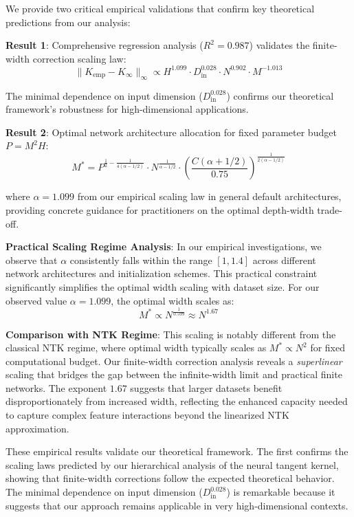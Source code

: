 \documentclass[a4paper]{article}
\theoremstyle{plain}
\theoremstyle{definition}
\theoremstyle{remark}
\begin{document}
\begin{tcolorbox}[colback=blue!10,colframe=blue!60!black,title={\textbf{🎯 VERIFICATION RESULTS}},enhanced,drop shadow]
We provide two critical empirical validations that confirm key theoretical predictions from our analysis:

\textbf{Result 1}: Comprehensive regression analysis ($R^2 = 0.987$) validates the finite-width correction scaling law:
\begin{equation}
\|K_{\text{emp}} - K_{\infty}\|_\infty \propto H^{1.099} \cdot D_{\text{in}}^{0.028} \cdot N^{0.902} \cdot M^{-1.013}
\label{eq:empirical_scaling_validation}
\end{equation}

The minimal dependence on input dimension ($D_{\text{in}}^{0.028}$) confirms our theoretical framework's robustness for high-dimensional applications.

\textbf{Result 2}: Optimal network architecture allocation for fixed parameter budget $P = M^2H$:
\begin{equation}
M^* = P^{\frac{1}{2} - \frac{1}{4(\alpha - 1/2)}} \cdot N^{\frac{1}{\alpha - 1/2}} \cdot \left(\frac{C(\alpha + 1/2)}{0.75}\right)^{\frac{1}{2(\alpha - 1/2)}}
\label{eq:optimal_allocation_formula}
\end{equation}

where $\alpha = 1.099$ from our empirical scaling law in general default architectures, providing concrete guidance for practitioners on the optimal depth-width trade-off.

\textbf{Practical Scaling Regime Analysis}: In our empirical investigations, we observe that $\alpha$ consistently falls within the range $[1, 1.4]$ across different network architectures and initialization schemes. This practical constraint significantly simplifies the optimal width scaling with dataset size. For our observed value $\alpha = 1.099$, the optimal width scales as:
\begin{equation}
M^* \propto N^{\frac{1}{0.599}} \approx N^{1.67}
\label{eq:practical_width_scaling}
\end{equation}

\textbf{Comparison with NTK Regime}: This scaling is notably different from the classical NTK regime, where optimal width typically scales as $M^* \propto N^{2}$ for fixed computational budget. Our finite-width correction analysis reveals a \textit{superlinear} scaling that bridges the gap between the infinite-width limit and practical finite networks. The exponent $1.67$ suggests that larger datasets benefit disproportionately from increased width, reflecting the enhanced capacity needed to capture complex feature interactions beyond the linearized NTK approximation.
\end{tcolorbox}
These empirical results validate our theoretical framework. The first confirms the scaling laws predicted by our hierarchical analysis of the neural tangent kernel, showing that finite-width corrections follow the expected theoretical behavior. The minimal dependence on input dimension ($D_{\text{in}}^{0.028}$) is remarkable because it suggests that our approach remains applicable in very high-dimensional contexts.
\end{document}
